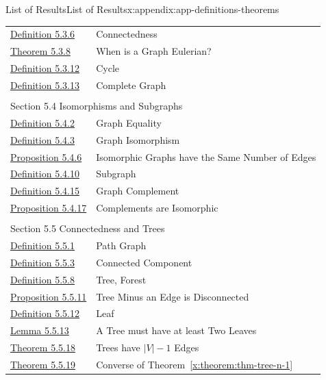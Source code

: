 \documentclass[oneside,10pt,]{book}
\newcommand{\xreffont}{\relax}
\numberwithin{equation}{section}
\begin{document}
\begin{appendixptx}{List of Results}{}{List of Results}{}{}{x:appendix:app-definitions-theorems}
\begin{longtable}[l]{ll}
\hyperref[x:definition:def-connected]{Definition 5.3.6}& Connectedness\\
\hyperref[x:theorem:thm-eulerian]{Theorem 5.3.8}& When is a Graph Eulerian?\\
\hyperref[x:definition:def-cycle]{Definition 5.3.12}& Cycle\\
\hyperref[x:definition:def-complete-graph]{Definition 5.3.13}& Complete Graph\\
\multicolumn{2}{l}{\null}\\[1.5ex] \multicolumn{2}{l}{\large Section 5.4 Isomorphisms and Subgraphs}\\[0.5ex]
\hyperref[x:definition:def-graph-equality]{Definition 5.4.2}& Graph Equality\\
\hyperref[x:definition:def-graph-isomorphism]{Definition 5.4.3}& Graph Isomorphism\\
\hyperref[x:proposition:prop-graph-isomorphic-edges]{Proposition 5.4.6}& Isomorphic Graphs have the Same Number of Edges\\
\hyperref[x:definition:def-subgraph]{Definition 5.4.10}& Subgraph\\
\hyperref[x:definition:def-complement]{Definition 5.4.15}& Graph Complement\\
\hyperref[x:proposition:prop-graph-isomorphism-complement]{Proposition 5.4.17}& Complements are Isomorphic\\
\multicolumn{2}{l}{\null}\\[1.5ex] \multicolumn{2}{l}{\large Section 5.5 Connectedness and Trees}\\[0.5ex]
\hyperref[x:definition:def-path-graph]{Definition 5.5.1}& Path Graph\\
\hyperref[x:definition:def-connected-component]{Definition 5.5.3}& Connected Component\\
\hyperref[x:definition:def-tree]{Definition 5.5.8}& Tree, Forest\\
\hyperref[x:proposition:prop-tree-remove-edge-disconnect]{Proposition 5.5.11}& Tree Minus an Edge is Disconnected\\
\hyperref[x:definition:def-leaf]{Definition 5.5.12}& Leaf\\
\hyperref[x:lemma:lem-tree-number-leaves]{Lemma 5.5.13}& A Tree must have at least Two Leaves\\
\hyperref[x:theorem:thm-tree-n-1]{Theorem 5.5.18}& Trees have \(|V|-1\) Edges\\
\hyperref[x:theorem:thm-n-1-tree]{Theorem 5.5.19}& Converse of Theorem~{\xreffont\ref*{x:theorem:thm-tree-n-1}}\\

\end{longtable}
\end{appendixptx}
\end{document}
